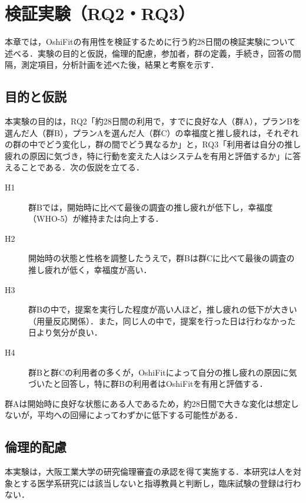 \chapter{検証実験（RQ2・RQ3）}
本章では，OshiFitの有用性を検証するために行う約28日間の検証実験について述べる．実験の目的と仮説，倫理的配慮，参加者，群の定義，手続き，回答の間隔，測定項目，分析計画を述べた後，結果と考察を示す．

\section{目的と仮説}
本実験の目的は，RQ2「約28日間の利用で，すでに良好な人（群A），プランBを選んだ人（群B），プランAを選んだ人（群C）の幸福度と推し疲れは，それぞれの群の中でどう変化し，群の間でどう異なるか」と，RQ3「利用者は自分の推し疲れの原因に気づき，特に行動を変えた人はシステムを有用と評価するか」に答えることである．次の仮説を立てる．

\begin{description}
\item[H1] 群Bでは，開始時に比べて最後の調査の推し疲れが低下し，幸福度（WHO-5）が維持または向上する．
\item[H2] 開始時の状態と性格を調整したうえで，群Bは群Cに比べて最後の調査の推し疲れが低く，幸福度が高い．
\item[H3] 群Bの中で，提案を実行した程度が高い人ほど，推し疲れの低下が大きい（用量反応関係）．また，同じ人の中で，提案を行った日は行わなかった日より気分が良い．
\item[H4] 群Bと群Cの利用者の多くが，OshiFitによって自分の推し疲れの原因に気づいたと回答し，特に群Bの利用者はOshiFitを有用と評価する．
\end{description}

群Aは開始時に良好な状態にある人であるため，約28日間で大きな変化は想定しないが，平均への回帰によってわずかに低下する可能性がある．

\section{倫理的配慮}
本実験は，大阪工業大学の研究倫理審査の承認を得て実施する．本研究は人を対象とする医学系研究には該当しないと指導教員と判断し，臨床試験の登録は行わない．

